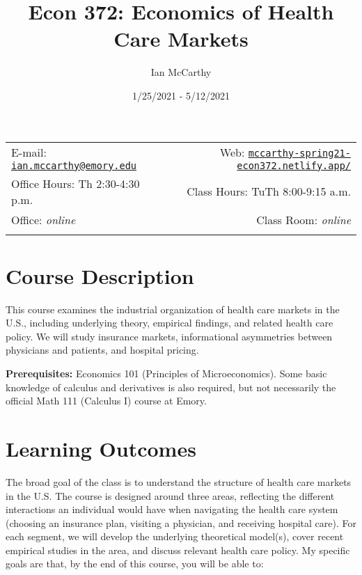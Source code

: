 \documentclass[11pt,]{article}
\title{Econ 372: Economics of Health Care Markets}
\author{Ian McCarthy}
\date{1/25/2021 - 5/12/2021}
\begin{document}
  

		\maketitle
		
	
		\thispagestyle{firststyle}



	\noindent \begin{tabular*}{\textwidth}{ @{\extracolsep{\fill}} lr @{\extracolsep{\fill}}}


E-mail: \texttt{\href{mailto:ian.mccarthy@emory.edu}{\nolinkurl{ian.mccarthy@emory.edu}}} & Web: \href{http://mccarthy-spring21-econ372.netlify.app/}{\tt mccarthy-spring21-econ372.netlify.app/}\\
Office Hours: Th 2:30-4:30 p.m.  &  Class Hours: TuTh 8:00-9:15 a.m.\\
Office: \emph{online}  & Class Room: \emph{online}\\
	&  \\
	\hline
	\end{tabular*}
	
\vspace{2mm}
	


\hypertarget{course-description}{%
\section{Course Description}\label{course-description}}

This course examines the industrial organization of health care markets
in the U.S., including underlying theory, empirical findings, and
related health care policy. We will study insurance markets,
informational asymmetries between physicians and patients, and hospital
pricing.

\textbf{Prerequisites:} Economics 101 (Principles of Microeconomics).
Some basic knowledge of calculus and derivatives is also required, but
not necessarily the official Math 111 (Calculus I) course at Emory.

\hypertarget{learning-outcomes}{%
\section{Learning Outcomes}\label{learning-outcomes}}

The broad goal of the class is to understand the structure of health
care markets in the U.S. The course is designed around three areas,
reflecting the different interactions an individual would have when
navigating the health care system (choosing an insurance plan, visiting
a physician, and receiving hospital care). For each segment, we will
develop the underlying theoretical model(s), cover recent empirical
studies in the area, and discuss relevant health care policy. My
specific goals are that, by the end of this course, you will be able to:
\end{document}
